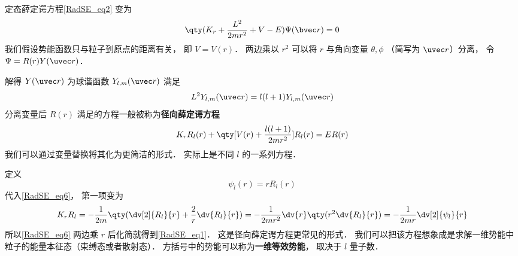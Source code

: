 定态薛定谔方程\autoref{RadSE_eq2} 变为
\begin{equation}
\qty(K_r + \frac{L^2}{2mr^2} + V - E)\Psi(\bvec r) = 0
\end{equation}
我们假设势能函数只与粒子到原点的距离有关， 即 $V = V(r)$． 两边乘以 $r^2$ 可以将 $r$ 与角向变量 $\theta, \phi$ （简写为 $\uvec r$）分离， 令 $\Psi = R(r)Y(\uvec r)$．

解得 $Y(\uvec r)$ 为球谐函数 $Y_{l,m}(\uvec r)$ 满足
\begin{equation}
L^2 Y_{l,m}(\uvec r) = l(l+1) Y_{l,m}(\uvec r)
\end{equation}
分离变量后 $R(r)$ 满足的方程一般被称为\textbf{径向薛定谔方程}
\begin{equation}\label{RadSE_eq6}
K_r R_l(r) + \qty[V(r) + \frac{l(l+1)}{2mr^2} ]R_l(r) = ER(r)
\end{equation}
我们可以通过变量替换将其化为更简洁的形式． 实际上是不同 $l$ 的一系列方程．

定义
\begin{equation}
\psi_l(r) = r R_l(r)
\end{equation}
代入\autoref{RadSE_eq6}， 第一项变为
\begin{equation}
K_r R_l =  - \frac{1}{2m} \qty(\dv[2]{R_l}{r} + \frac2r \dv{R_l}{r}) = -\frac{1}{2mr^2} \dv{r} \qty(r^2\dv{R_l}{r}) =  -\frac{1}{2mr} \dv[2]{\psi_l}{r}
\end{equation}
所以\autoref{RadSE_eq6} 两边乘 $r$ 后化简就得到\autoref{RadSE_eq1}． 这是径向薛定谔方程更常见的形式． 我们可以把该方程想象成是求解一维势能中粒子的能量本征态（束缚态或者散射态）． 方括号中的势能可以称为\textbf{一维等效势能}， 取决于 $l$ 量子数．
